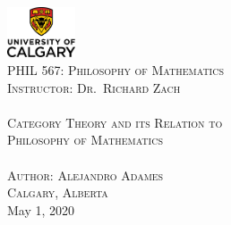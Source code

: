 \begin{titlepage}
\begin{center}
    
    \includegraphics[width=0.15\textwidth]{images/uc-vert-rgb.png}~\\[2.5cm]
    
    \textsc{\Large PHIL 567: Philosophy of Mathematics}\\[2.5cm]
    
    \textsc{\Large Instructor: Dr.~Richard Zach}\\[2.75cm]
    
    \HRule \\[0.4cm]
    \textsc{\LARGE Category Theory and its Relation to \\\vspace{0.5ex}
    Philosophy of Mathematics}\\[0.4cm]
    \HRule \\ [3.0cm]


    \textsc{\Large Author: Alejandro Adames}\\[3.0cm]

    \textsc{Calgary, Alberta}\\ [0.5cm]

    {\large May 1, 2020}
\end{center}
\end{titlepage}
